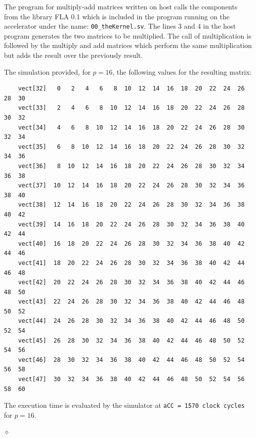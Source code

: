 \begin{exemplu}
The program for multiply-add matrices written on host calls the components from the library FLA 0.1 which is included in the program running on the accelerator under the name: {\tt 00\_theKernel.sv}. The  lines 3 and 4 in the host program generates the two matrices to be multiplied. The call of multiplication is followed by the multiply and add matrices which perform the same multiplication but adds the result over the previously result.

{\em 
{}
}
The simulation provided, for $p=16$, the following values for the resulting matrix:
{\small
\begin{verbatim}
    vect[32]   0   2   4   6   8  10  12  14  16  18  20  22  24  26  28  30
    vect[33]   2   4   6   8  10  12  14  16  18  20  22  24  26  28  30  32
    vect[34]   4   6   8  10  12  14  16  18  20  22  24  26  28  30  32  34
    vect[35]   6   8  10  12  14  16  18  20  22  24  26  28  30  32  34  36
    vect[36]   8  10  12  14  16  18  20  22  24  26  28  30  32  34  36  38
    vect[37]  10  12  14  16  18  20  22  24  26  28  30  32  34  36  38  40
    vect[38]  12  14  16  18  20  22  24  26  28  30  32  34  36  38  40  42
    vect[39]  14  16  18  20  22  24  26  28  30  32  34  36  38  40  42  44
    vect[40]  16  18  20  22  24  26  28  30  32  34  36  38  40  42  44  46
    vect[41]  18  20  22  24  26  28  30  32  34  36  38  40  42  44  46  48
    vect[42]  20  22  24  26  28  30  32  34  36  38  40  42  44  46  48  50
    vect[43]  22  24  26  28  30  32  34  36  38  40  42  44  46  48  50  52
    vect[44]  24  26  28  30  32  34  36  38  40  42  44  46  48  50  52  54
    vect[45]  26  28  30  32  34  36  38  40  42  44  46  48  50  52  54  56
    vect[46]  28  30  32  34  36  38  40  42  44  46  48  50  52  54  56  58
    vect[47]  30  32  34  36  38  40  42  44  46  48  50  52  54  56  58  60
\end{verbatim}
}
The execution time is evaluated by the simulator at {\tt aCC = 1570 clock cycles} for $p = 16$.

$\diamond$
\end{exemplu}